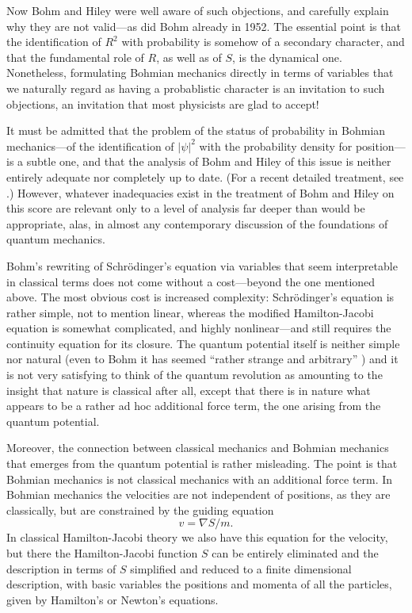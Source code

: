 \documentclass[12pt]{article}
\begin{document}
Now Bohm and Hiley were well aware of such objections, and carefully
explain why they are not valid---as did Bohm already in 1952. The essential
point is that the identification of $R^2$ with probability is somehow of a
secondary character, and that the fundamental role of $R$, as well as of $S$,
is the dynamical one. Nonetheless, formulating Bohmian mechanics directly
in terms of variables that we naturally regard as having a probablistic
character is an invitation to such objections, an invitation that most
physicists are glad to accept!

It must be admitted that the problem of the status of probability in
Bohmian mechanics---of the identification of ${|\psi|}^2$ with the
probability density for position---is a subtle one, and that the analysis
of Bohm and Hiley of this issue is neither entirely adequate nor completely
up to date. (For a recent detailed treatment, see \cite{DGZ}.) However,
whatever inadequacies exist in the treatment of Bohm and Hiley on this
score are relevant only to a level of analysis far deeper than would be
appropriate, alas, in almost any contemporary discussion of the foundations
of quantum mechanics.

Bohm's rewriting of Schr\"odinger's equation via variables that seem
interpretable in classical terms does not come without a cost---beyond the
one mentioned above. The most obvious cost is increased complexity:
Schr\"odinger's equation is rather simple, not to mention linear, whereas
the modified Hamilton-Jacobi equation is somewhat complicated, and highly
nonlinear---and still requires the continuity equation for its closure. The
quantum potential itself is neither simple nor natural (even to Bohm it has
seemed ``rather strange and arbitrary'' \cite{bohm}) and it is not very
satisfying to think of the quantum revolution as amounting to the insight
that nature is classical after all, except that there is in nature what
appears to be a rather ad hoc additional force term, the one arising from
the quantum potential.

Moreover, the connection between classical mechanics and Bohmian mechanics
that emerges from the quantum potential is rather misleading. The point is
that Bohmian mechanics is not classical mechanics with an additional force
term. In Bohmian mechanics the velocities are not independent of positions,
as they are classically, but are constrained by the guiding equation $$
v=\nabla S/m.  $$ In classical Hamilton-Jacobi theory we also have this
equation for the velocity, but there the Hamilton-Jacobi function $S$ can
be entirely eliminated and the description in terms of $S$ simplified and
reduced to a finite dimensional description, with basic variables the
positions and momenta of all the particles, given by Hamilton's or
Newton's equations.
\end{document}
